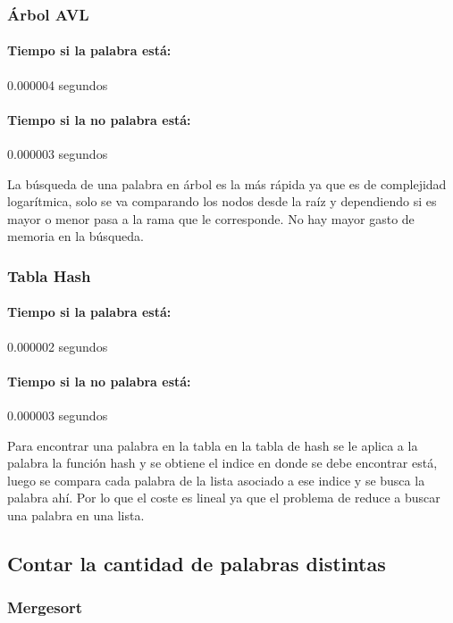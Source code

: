 \documentclass[12pt,letterpaper]{scrartcl}
\begin{document}
\subsubsection{Árbol AVL}

\paragraph{Tiempo si la palabra está:} 0.000004 segundos

\paragraph{Tiempo si la no palabra está:} 0.000003 segundos

La búsqueda de una palabra en árbol es la más rápida ya que es de complejidad logarítmica, solo se va comparando los nodos desde la raíz y dependiendo si es mayor o menor pasa a la rama que le corresponde. No hay mayor gasto de memoria en la búsqueda.

\subsubsection{Tabla Hash}

\paragraph{Tiempo si la palabra está:} 0.000002 segundos

\paragraph{Tiempo si la no palabra está:} 0.000003 segundos

Para encontrar una palabra en la tabla en la tabla de hash se le aplica a la palabra la función hash y se obtiene el indice en donde se debe encontrar está, luego se compara cada palabra de la lista asociado a ese indice y se busca la palabra ahí. Por lo que el coste es lineal ya que el problema de reduce a buscar una palabra en una lista.

\subsection{Contar la cantidad de palabras distintas}

\subsubsection{Mergesort}
\end{document}
